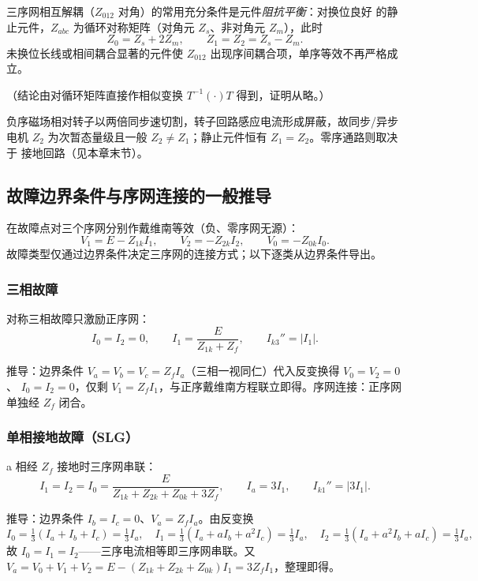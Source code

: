 \begin{proposition}[序网独立的条件]
三序网相互解耦（$Z_{012}$ 对角）的常用充分条件是元件\emph{阻抗平衡}：对换位良好
的静止元件，$Z_{abc}$ 为循环对称矩阵（对角元 $Z_s$、非对角元 $Z_m$），此时
\begin{equation}
Z_0=Z_s+2Z_m,\qquad Z_1=Z_2=Z_s-Z_m .
\end{equation}
未换位长线或相间耦合显著的元件使 $Z_{012}$ 出现序间耦合项，单序等效不再严格成立。
\end{proposition}
（结论由对循环矩阵直接作相似变换 $T^{-1}(\cdot)T$ 得到，证明从略。）

\begin{remark}[旋转电机 $Z_1\ne Z_2$]
负序磁场相对转子以两倍同步速切割，转子回路感应电流形成屏蔽，故同步/异步电机
$Z_2$ 为次暂态量级且一般 $Z_2\ne Z_1$；静止元件恒有 $Z_1=Z_2$。零序通路则取决于
接地回路（见本章末节）。
\end{remark}

\subsection{故障边界条件与序网连接的一般推导}
在故障点对三个序网分别作戴维南等效（负、零序网无源）：
\begin{equation}
V_1=E-Z_{1k}I_1,\qquad V_2=-Z_{2k}I_2,\qquad V_0=-Z_{0k}I_0 .
\end{equation}
故障类型仅通过边界条件决定三序网的连接方式；以下逐类从边界条件导出。

\subsubsection{三相故障}
\begin{proposition}
对称三相故障只激励正序网：
\begin{equation}
I_0=I_2=0,\qquad I_1=\frac{E}{Z_{1k}+Z_f},\qquad I_{k3}''=|I_1|.
\end{equation}
\end{proposition}
推导：边界条件 $V_a=V_b=V_c=Z_f I_a$（三相一视同仁）代入反变换得 $V_0=V_2=0$、
$I_0=I_2=0$，仅剩 $V_1=Z_f I_1$，与正序戴维南方程联立即得。序网连接：正序网
单独经 $Z_f$ 闭合。

\subsubsection{单相接地故障（SLG）}
\begin{proposition}
a 相经 $Z_f$ 接地时三序网串联：
\begin{equation}
I_1=I_2=I_0=\frac{E}{Z_{1k}+Z_{2k}+Z_{0k}+3Z_f},\qquad
I_a=3I_1,\qquad I_{k1}''=|3I_1|.
\end{equation}
\end{proposition}
推导：边界条件 $I_b=I_c=0$、$V_a=Z_f I_a$。由反变换
\begin{equation}
I_0=\tfrac13(I_a+I_b+I_c)=\tfrac13I_a,\quad
I_1=\tfrac13(I_a+aI_b+a^2I_c)=\tfrac13I_a,\quad
I_2=\tfrac13(I_a+a^2I_b+aI_c)=\tfrac13I_a,
\end{equation}
故 $I_0=I_1=I_2$——三序电流相等即三序网串联。又
$V_a=V_0+V_1+V_2=E-(Z_{1k}+Z_{2k}+Z_{0k})I_1=3Z_f I_1$，整理即得。

